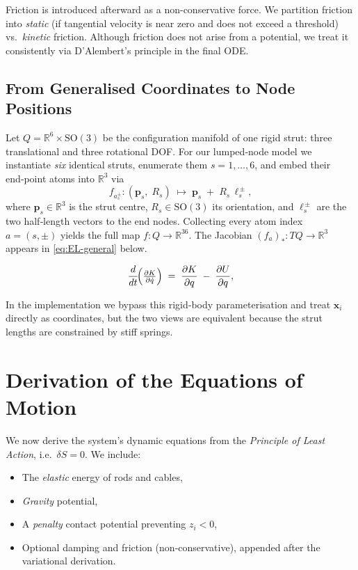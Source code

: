 \documentclass[12pt,letterpaper]{article}
\newcommand{\R}{\mathbb{R}}
\newcommand{\x}{\bm{x}}
\begin{document}
Friction is introduced afterward as a non-conservative force. We partition friction into \emph{static} (if tangential velocity is near zero and does not exceed a threshold) vs.\ \emph{kinetic} friction. Although friction does not arise from a potential, we treat it consistently via D'Alembert’s principle in the final ODE.

\subsection{From Generalised Coordinates to Node Positions}
\label{sec:Q2R3}
Let $Q=\R^{6}\times\mathrm{SO}(3)$ be the configuration manifold of one rigid
strut: three translational and three rotational DOF.  For our lumped‑node model
we instantiate \emph{six} identical struts, enumerate them $s=1,\dots,6$, and
embed their end‑point atoms into $\R^{3}$ via
\[
  f_{a_s^\pm} :
  (\bm{p}_s,\;R_s) \;\longmapsto\;
  \bm{p}_s \;+\; R_s\,\bm{\ell}_{s}^{\,\pm},
\]
where $\bm{p}_s\in\R^{3}$ is the strut centre, $R_s\!\in\!\mathrm{SO}(3)$ its
orientation, and $\bm{\ell}_{s}^{\,\pm}$ are the two half‑length vectors to the
end nodes.  Collecting every atom index $a=(s,\pm)$ yields the full map
$f:Q\to\R^{36}$. The Jacobian $(f_a)_{*}:TQ\to\R^{3}$ appears in \eqref{eq:EL-general} below. 

\begin{equation}
  \frac{d}{dt}\!\Bigl(\tfrac{\partial K}{\partial\dot q}\Bigr)
  \;=\;
  \frac{\partial K}{\partial q}
  \;-\;
  \frac{\partial U}{\partial q},
  \label{eq:EL-general}
\end{equation}

In the implementation we bypass this rigid‑body
parameterisation and treat $\x_i$ directly as coordinates, but the two views are
equivalent because the strut lengths are constrained by stiff springs.

\section{Derivation of the Equations of Motion}
\label{sec:derivation}
We now derive the system’s dynamic equations from the \emph{Principle of Least Action}, i.e.\ $\delta S = 0$. We include:
\begin{itemize}
    \item The \emph{elastic} energy of rods and cables,
    \item \emph{Gravity} potential,
    \item A \emph{penalty} contact potential preventing $z_i < 0$,
    \item Optional damping and friction (non‑conservative), appended after the variational derivation.
\end{itemize}
\end{document}
